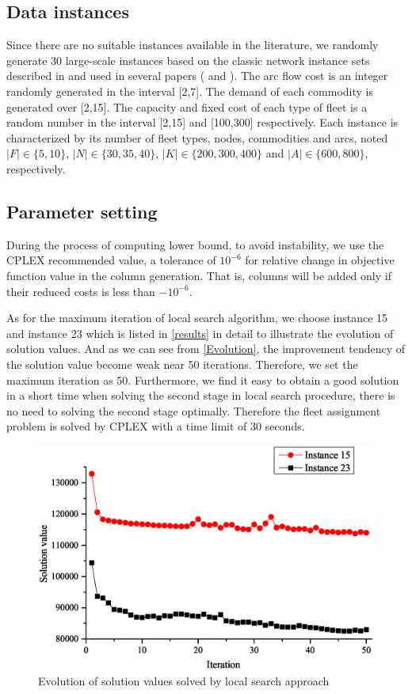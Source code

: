 \documentclass[11pt,nonblindrev,fleqn]{article}
\begin{document}
\subsection{Data instances}
Since there are no suitable instances available in the literature, we randomly generate 30 large-scale instances based on the classic network instance sets described in \cite{crainic2001bundle} and used in several papers (\cite{Ghamlouche2003Cycle,Pedersen2009Models} and \cite{Chouman2015Cutting}). The arc flow cost is an integer randomly generated in the interval [2,7]. The demand of each commodity is generated over [2,15]. The capacity and fixed cost of each type of fleet is a random number in the interval [2,15] and [100,300] respectively. Each instance is characterized by its number of fleet types, nodes, commodities and arcs, noted $|F|\in \{5,10\}$, $|N|\in \{30,35,40\}$, $|K|\in \{200,300,400\}$ and $|A|\in \{600,800\}$, respectively.

\subsection{Parameter setting}
During the process of computing lower bound, to avoid instability, we use the CPLEX recommended value, a tolerance of $10^{-6}$ for relative change in objective function value in the column generation. That is, columns will be added only if their reduced costs is less than $-10^{-6}$.

As for the maximum iteration of local search algorithm, we choose instance 15 and instance 23 which is listed in \autoref{results} in detail to illustrate the evolution of solution values. And as we can see from \autoref{Evolution}, the improvement tendency of the solution value become weak near 50 iterations. Therefore, we set the maximum iteration as 50. Furthermore, we find it easy to obtain a good solution in a short time when solving the second stage in local search procedure, there is no need to solving the second stage optimally. Therefore the fleet assignment problem is solved by CPLEX with a time limit of 30 seconds.
\begin{figure}[H]
\setlength{\abovecaptionskip}{-5pt}
\setlength{\belowcaptionskip}{-5pt}
\centering
\includegraphics[width=0.9\linewidth]{F4.eps}
\caption{Evolution of solution values solved by local search approach}
\label{Evolution}
\end{figure}
\end{document}
